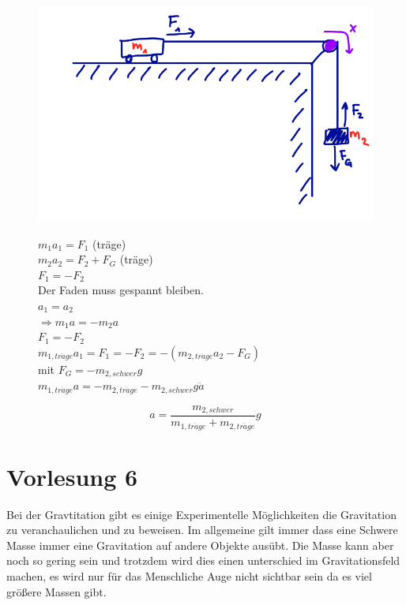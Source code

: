 \documentclass[11pt]{article}
\begin{document}
	\begin{figure}[htbp]
		\begin{minipage}[t]{6cm}
			\vspace{0pt}
			\centering
			\includegraphics[scale=0.35]{IMG_E8A9C85E8431-1.jpeg}
		\end{minipage}
		\hfill
		\begin{minipage}[t]{6cm}
			\vspace{0pt}
			$ m_1 a_1 = F_1 $ (träge)\\
			$ m_2 a_2 = F_2 + F_G $ (träge)\\
			$ F_1 = - F_2 $\\
			Der Faden muss gespannt bleiben.\\
			$ a_1 = a_2 $\\
			$\Rightarrow m_1 a = - m_2 a $\\
			$ F_1 = -F_2 $\\
			$ m_{1, tr\ddot{a}ge} a_1 = F_1 = - F_2 = -(m_{2, tr\ddot{a}ge} a_2 -F_G) $\\
			mit $ F_G = -m_{2, schwer} g $\\
			$m_{1, tr\ddot{a}ge} a = - m_{2, tr\ddot{a}ge} - m_{2, schwer} g	\ddot{a}$
		\end{minipage}
	\end{figure}
	\[ a = \frac{m_{2, schwer}}{m_{1,tr\ddot{a}ge} + m_{2,tr\ddot{a}ge}} g \]
	\part{Vorlesung 6}
	Bei der Gravtitation gibt es einige Experimentelle Möglichkeiten die Gravitation zu veranchaulichen und zu beweisen. Im allgemeine gilt immer dass eine Schwere Masse immer eine Gravitation auf andere Objekte ausübt. Die Masse kann aber noch so gering sein und trotzdem wird dies einen unterschied im Gravitationsfeld machen, es wird nur für das Menschliche Auge nicht sichtbar sein da es viel größere Massen gibt.
\end{document}
